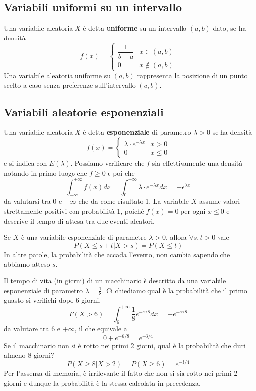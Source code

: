 \subsection{Variabili uniformi su un intervallo}
Una variabile aleatoria $X$ è detta \textbf{uniforme} su un intervallo $(a, b)$ dato, se ha densità
\[
	f(x) = \begin{cases}
		\dfrac{1}{b - a} & x \in (a, b)    \\[2ex]
		0                & x \notin (a, b)
	\end{cases}
\]
Una variabile aleatoria uniforme su $(a,b)$ rappresenta la posizione di un punto scelto a caso
senza preferenze sull'intervallo $(a, b)$.

\subsection{Variabili aleatorie esponenziali}
Una variabile aleatoria $X$ è detta \textbf{esponenziale} di parametro $\lambda > 0$ se ha densità
\[
	f(x) = \begin{cases}
		\lambda \cdot e^{-\lambda x} & x > 0    \\[2ex]
		0                            & x \leq 0
	\end{cases}
\]
e si indica con $E(\lambda)$. Possiamo verificare che $f$ sia effettivamente una densità notando
in primo luogo che $f \geq 0$ e poi che
\[
	\int_{-\infty}^{+\infty} f(x) dx =
	\int_0^{+\infty} \lambda \cdot e^{-\lambda x} dx =
	-e^{\lambda x}
\]
da valutarsi tra 0 e $+\infty$ che da come risultato 1. La variabile $X$ assume valori strettamente
positivi con probabilità 1, poiché $f(x) = 0$ per ogni $x \leq 0$ e descrive il tempo di attesa tra
due eventi aleatori.

\begin{proposition}
	Se $X$ è una variabile esponenziale di parametro $\lambda > 0$, allora $\forall s,t > 0$ vale
	\[ P(X \leq s + t | X > s) = P(X \leq t) \]
	In altre parole, la probabilità che accada l'evento, non cambia sapendo che abbiamo atteso $s$.
\end{proposition}

\begin{example}
	Il tempo di vita (in giorni) di un macchinario è descritto da una variabile esponenziale di
	parametro $\lambda = \frac{1}{8}$. Ci chiediamo qual è la probabilità che il primo guasto si
	verifichi dopo 6 giorni.
	\[ P(X > 6) = \int_{6}^{+\infty} \frac{1}{8} e^{-x/8} dx = -e^{-x/8} \]
	da valutare tra 6 e $+\infty$, il che equivale a
	\[ 0 + e^{-6/8} = e^{-3/4} \]
	Se il macchinario non si è rotto nei primi 2 giorni, qual è la probabilità che duri almeno 8
	giorni?
	\[ P(X \geq 8 | X > 2) = P(X \geq 6) = e^{-3/4} \]
	Per l'assenza di memoria, è irrilevante il fatto che non si sia rotto nei primi 2 giorni e
	dunque la probabilità è la stessa calcolata in precedenza.
\end{example}

